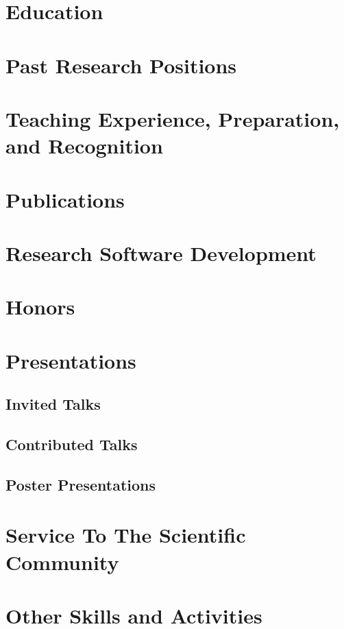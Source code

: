 \documentclass{prometheus_cv}
\begin{document}
\thispagestyle{empty}					%
\pagestyle{fancy}			 		%

\vspace*{-1cm}
\centering 


\section{Education}


\section{Past Research Positions}


\section{Teaching Experience, Preparation, and Recognition}


\section{Publications}


\section{Research Software Development}


\section{Honors}


\section{Presentations}
\subsection{Invited Talks}


\subsection{Contributed Talks}


\subsection{Poster Presentations}


\section{Service To The Scientific Community}


\section{Other Skills and Activities}

\end{document}
